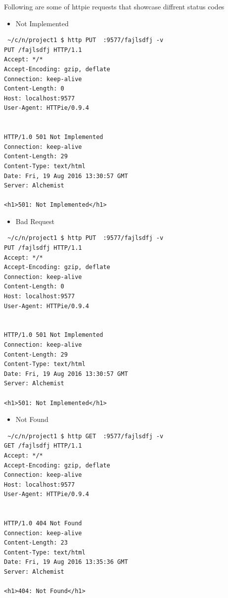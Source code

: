 \documentclass[11pt]{article}
\begin{document}
Following are some of httpie requests that showcase diffrent status codes
\begin{itemize}
\item Not Implemented
\end{itemize}
\begin{verbatim}
 ~/c/n/project1 $ http PUT  :9577/fajlsdfj -v
PUT /fajlsdfj HTTP/1.1
Accept: */*
Accept-Encoding: gzip, deflate
Connection: keep-alive
Content-Length: 0
Host: localhost:9577
User-Agent: HTTPie/0.9.4


HTTP/1.0 501 Not Implemented
Connection: keep-alive
Content-Length: 29
Content-Type: text/html
Date: Fri, 19 Aug 2016 13:30:57 GMT
Server: Alchemist

<h1>501: Not Implemented</h1>
\end{verbatim}
\begin{itemize}
\item Bad Request
\end{itemize}
\begin{verbatim}
 ~/c/n/project1 $ http PUT  :9577/fajlsdfj -v
PUT /fajlsdfj HTTP/1.1
Accept: */*
Accept-Encoding: gzip, deflate
Connection: keep-alive
Content-Length: 0
Host: localhost:9577
User-Agent: HTTPie/0.9.4


HTTP/1.0 501 Not Implemented
Connection: keep-alive
Content-Length: 29
Content-Type: text/html
Date: Fri, 19 Aug 2016 13:30:57 GMT
Server: Alchemist

<h1>501: Not Implemented</h1>
\end{verbatim}
\begin{itemize}
\item Not Found
\end{itemize}
\begin{verbatim}
 ~/c/n/project1 $ http GET  :9577/fajlsdfj -v
GET /fajlsdfj HTTP/1.1
Accept: */*
Accept-Encoding: gzip, deflate
Connection: keep-alive
Host: localhost:9577
User-Agent: HTTPie/0.9.4


HTTP/1.0 404 Not Found
Connection: keep-alive
Content-Length: 23
Content-Type: text/html
Date: Fri, 19 Aug 2016 13:35:36 GMT
Server: Alchemist

<h1>404: Not Found</h1>
\end{verbatim}
\end{document}

